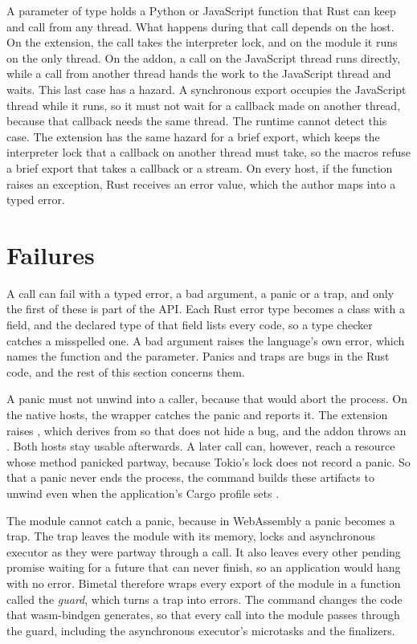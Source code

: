 \documentclass[sigconf,nonacm]{acmart}
\begin{document}
A parameter of type  holds a Python or JavaScript function that Rust can keep and call from any thread. What happens during that call depends on the host. On the extension, the call takes the interpreter lock, and on the module it runs on the only thread. On the addon, a call on the JavaScript thread runs directly, while a call from another thread hands the work to the JavaScript thread and waits. This last case has a hazard. A synchronous export occupies the JavaScript thread while it runs, so it must not wait for a callback made on another thread, because that callback needs the same thread. The runtime cannot detect this case. The extension has the same hazard for a brief export, which keeps the interpreter lock that a callback on another thread must take, so the macros refuse a brief export that takes a callback or a stream. On every host, if the function raises an exception, Rust receives an error value, which the author maps into a typed error.

\section{Failures}
\label{sec:failures}

A call can fail with a typed error, a bad argument, a panic or a trap, and only the first of these is part of the API. Each Rust error type becomes a class with a  field, and the declared type of that field lists every code, so a type checker catches a misspelled one. A bad argument raises the language's own error, which names the function and the parameter. Panics and traps are bugs in the Rust code, and the rest of this section concerns them.

A panic must not unwind into a caller, because that would abort the process. On the native hosts, the wrapper catches the panic and reports it. The extension raises , which derives from  so that  does not hide a bug, and the addon throws an . Both hosts stay usable afterwards. A later call can, however, reach a resource whose  method panicked partway, because Tokio's lock does not record a panic. So that a panic never ends the process, the command builds these artifacts to unwind even when the application's Cargo profile sets .

The module cannot catch a panic, because in WebAssembly a panic becomes a trap. The trap leaves the module with its memory, locks and asynchronous executor as they were partway through a call. It also leaves every other pending promise waiting for a future that can never finish, so an application would hang with no error. Bimetal therefore wraps every export of the module in a function called the \emph{guard}, which turns a trap into errors. The command changes the code that wasm-bindgen generates, so that every call into the module passes through the guard, including the asynchronous executor's microtasks and the finalizers.
\end{document}
